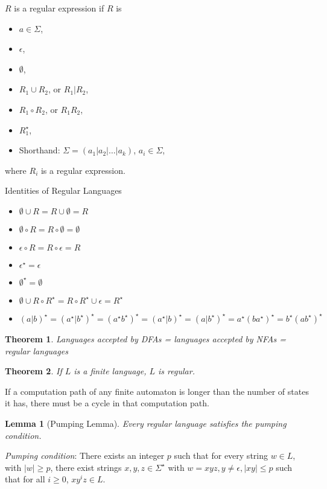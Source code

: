 \documentclass[letterpaper,landscape,11pt]{article}
\newtheorem{theorem}{Theorem}
\newtheorem{lemma}{Lemma}
\begin{document}
$R$ is a regular expression if $R$ is
\begin{itemize}
	\item $a \in \Sigma$,
	\item $\epsilon$,
	\item $\emptyset$,
	\item $R_1 \cup R_2$, or $R_1 | R_2$,
	\item $R_1 \circ R_2$, or $R_1R_2$,
	\item $R_1^\star$,
	\item Shorthand: $\Sigma = (a_1 | a_2 | \dots | a_k)$, $a_i \in \Sigma$,
\end{itemize}
where $R_i$ is a regular expression.

Identities of Regular Languages
\begin{itemize}
	\item $\emptyset \cup R = R \cup \emptyset = R$
	\item $\emptyset \circ R = R \circ \emptyset = \emptyset$
	\item $\epsilon \circ R = R \circ \epsilon = R$
	\item $\epsilon^\star = \epsilon$
	\item $\emptyset^\star = \emptyset$
	\item $\emptyset \cup R \circ R^\star = R \circ R^\star \cup \epsilon = R^\star$
	\item $(a | b)^\star = (a^\star | b^\star)^\star = (a^\star b^\star)^\star = (a^\star | b)^\star = (a | b^\star)^\star = a^\star(ba^\star)^\star = b^\star(ab^\star)^\star$
\end{itemize}

\begin{theorem}
	Languages accepted by DFAs = languages accepted by NFAs = regular languages
\end{theorem}

\begin{theorem}
	If $L$ is a finite language, $L$ is regular.
\end{theorem}

If a computation path of any finite automaton is longer than the number of states it has, there must be a cycle in that computation path.

\begin{lemma}[Pumping Lemma]
	Every regular language satisfies the pumping condition.
\end{lemma}

\emph{Pumping condition}: There exists an integer $p$ such that for every string $w \in L$, with $|w| \geq p$, there exist strings $x, y, z \in \Sigma^\star$ with $w = xyz, y \neq \epsilon, |xy| \leq p$ such that for all $i \geq 0$, $xy^iz \in L$.
\end{document}
